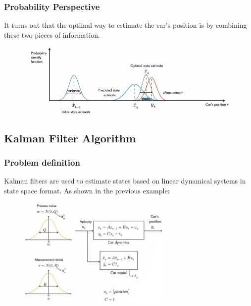 \documentclass{beamer}
\begin{document}
\begin{frame}
	\frametitle{Probability Perspective}
	 It turns out that the optimal way to estimate the car's position is by combining these two pieces of information. 
	 
	\begin{figure}
		\centering
		\includegraphics[width=11cm]{car_kf_relation1.png}
	\end{figure}
\end{frame}

\subsection{Kalman Filter Algorithm}

\begin{frame}
	\frametitle{Problem definition}
	Kalman filters are used to estimate states based on linear dynamical systems in state space format. As shown in the previous example:
	\begin{figure}
		\centering
			\includegraphics[width=2.6cm]{state_observer_of_previous1.png}
			\includegraphics[width=4.7cm]{state_observer_of_previous.png}
	\end{figure}
\end{frame}
\end{document}
